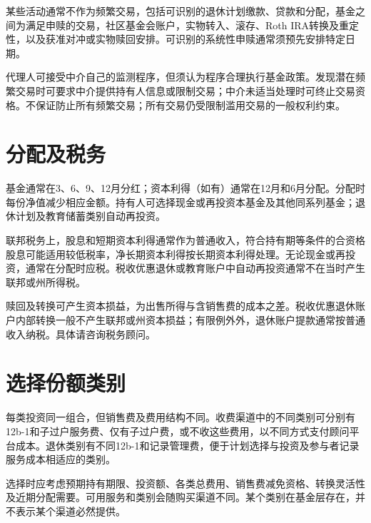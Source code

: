 \documentclass[UTF8,fontset=none,11pt,a4paper]{ctexart}
\begin{document}
某些活动通常不作为频繁交易，包括可识别的退休计划缴款、贷款和分配，基金之间为满足申赎的交易，社区基金会账户，实物转入、滚存、Roth IRA转换及重定性，以及获准对冲或实物赎回安排。可识别的系统性申赎通常须预先安排特定日期。


代理人可接受中介自己的监测程序，但须认为程序合理执行基金政策。发现潜在频繁交易时可要求中介提供持有人信息或限制交易；中介未适当处理时可终止交易资格。不保证防止所有频繁交易；所有交易仍受限制滥用交易的一般权利约束。


\section*{分配及税务}
基金通常在3、6、9、12月分红；资本利得（如有）通常在12月和6月分配。分配时每份净值减少相应金额。持有人可选择现金或再投资本基金及其他同系列基金；退休计划及教育储蓄类别自动再投资。


联邦税务上，股息和短期资本利得通常作为普通收入，符合持有期等条件的合资格股息可能适用较低税率，净长期资本利得按长期资本利得处理。无论现金或再投资，通常在分配时应税。税收优惠退休或教育账户中自动再投资通常不在当时产生联邦或州所得税。


赎回及转换可产生资本损益，为出售所得与含销售费的成本之差。税收优惠退休账户内部转换一般不产生联邦或州资本损益；有限例外外，退休账户提款通常按普通收入纳税。具体请咨询税务顾问。


\section*{选择份额类别}
每类投资同一组合，但销售费及费用结构不同。收费渠道中的不同类别可分别有12b-1和子过户服务费、仅有子过户费，或不收这些费用，以不同方式支付顾问平台成本。退休类别有不同12b-1和记录管理费，便于计划选择与投资及参与者记录服务成本相适应的类别。


选择时应考虑预期持有期限、投资额、各类总费用、销售费减免资格、转换灵活性及近期分配需要。可用服务和类别会随购买渠道不同。某个类别在基金层存在，并不表示某个渠道必然提供。
\end{document}
